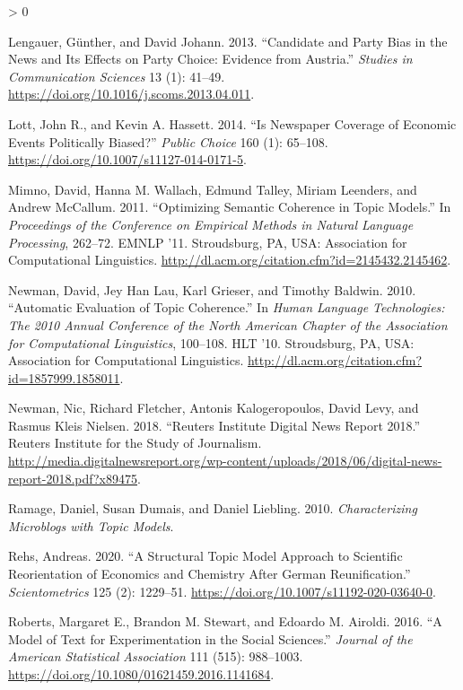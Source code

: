 \documentclass[
]{article}
\newlength{\cslhangindent}
\newenvironment{CSLReferences}[2] %
 {%
  \setlength{\parindent}{0pt}
  \ifodd #1 \everypar{\setlength{\hangindent}{\cslhangindent}}\ignorespaces\fi
  \ifnum #2 > 0
  \setlength{\parskip}{#2\baselineskip}
  \fi
 }%
 {}
\begin{document}
\begin{CSLReferences}{1}{0}
\leavevmode\hypertarget{ref-lengauer_candidate_2013}{}%
Lengauer, Günther, and David Johann. 2013. {``Candidate and Party Bias
in the News and Its Effects on Party Choice: Evidence from Austria.''}
\emph{Studies in Communication Sciences} 13 (1): 41--49.
\url{https://doi.org/10.1016/j.scoms.2013.04.011}.

\leavevmode\hypertarget{ref-lott_is_2014}{}%
Lott, John R., and Kevin A. Hassett. 2014. {``Is Newspaper Coverage of
Economic Events Politically Biased?''} \emph{Public Choice} 160 (1):
65--108. \url{https://doi.org/10.1007/s11127-014-0171-5}.

\leavevmode\hypertarget{ref-mimno_optimizing_2011}{}%
Mimno, David, Hanna M. Wallach, Edmund Talley, Miriam Leenders, and
Andrew McCallum. 2011. {``Optimizing Semantic Coherence in Topic
Models.''} In \emph{Proceedings of the Conference on Empirical Methods
in Natural Language Processing}, 262--72. {EMNLP} '11. Stroudsburg,
{PA}, {USA}: Association for Computational Linguistics.
\url{http://dl.acm.org/citation.cfm?id=2145432.2145462}.

\leavevmode\hypertarget{ref-newman_automatic_2010}{}%
Newman, David, Jey Han Lau, Karl Grieser, and Timothy Baldwin. 2010.
{``Automatic Evaluation of Topic Coherence.''} In \emph{Human Language
Technologies: The 2010 Annual Conference of the North American Chapter
of the Association for Computational Linguistics}, 100--108. {HLT} '10.
Stroudsburg, {PA}, {USA}: Association for Computational Linguistics.
\url{http://dl.acm.org/citation.cfm?id=1857999.1858011}.

\leavevmode\hypertarget{ref-newman_reuters_2018}{}%
Newman, Nic, Richard Fletcher, Antonis Kalogeropoulos, David Levy, and
Rasmus Kleis Nielsen. 2018. {``Reuters Institute Digital News Report
2018.''} Reuters Institute for the Study of Journalism.
\url{http://media.digitalnewsreport.org/wp-content/uploads/2018/06/digital-news-report-2018.pdf?x89475}.

\leavevmode\hypertarget{ref-ramage_characterizing_2010}{}%
Ramage, Daniel, Susan Dumais, and Daniel Liebling. 2010.
\emph{Characterizing Microblogs with Topic Models}.

\leavevmode\hypertarget{ref-rehs_structural_2020}{}%
Rehs, Andreas. 2020. {``A Structural Topic Model Approach to Scientific
Reorientation of Economics and Chemistry After German Reunification.''}
\emph{Scientometrics} 125 (2): 1229--51.
\url{https://doi.org/10.1007/s11192-020-03640-0}.

\leavevmode\hypertarget{ref-roberts_model_2016}{}%
Roberts, Margaret E., Brandon M. Stewart, and Edoardo M. Airoldi. 2016.
{``A Model of Text for Experimentation in the Social Sciences.''}
\emph{Journal of the American Statistical Association} 111 (515):
988--1003. \url{https://doi.org/10.1080/01621459.2016.1141684}.


\end{CSLReferences}
\end{document}
